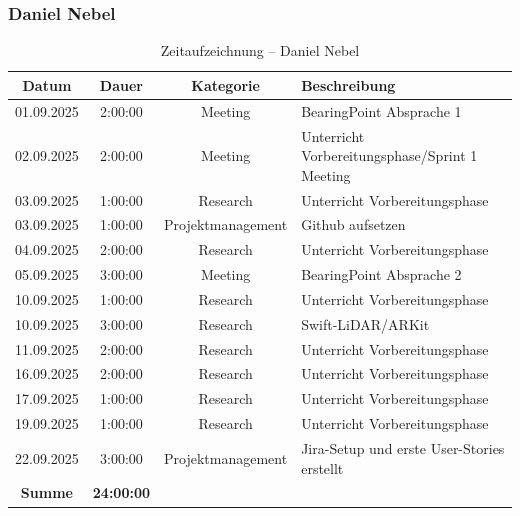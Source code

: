 \documentclass{article}
\begin{document}
\subsubsection*{Daniel Nebel}
\begin{table}[H]
  \centering
  \begin{tabularx}{\textwidth}{|c|c|c|X|}
    \hline
    \rowcolor{black!10}\textbf{Datum} & \textbf{Dauer} & \textbf{Kategorie} & \textbf{Beschreibung} \\
    \hline
    01.09.2025 & 2:00:00 & Meeting           & BearingPoint Absprache 1 \\ \hline
    02.09.2025 & 2:00:00 & Meeting           & Unterricht Vorbereitungsphase/Sprint 1 Meeting \\ \hline
    03.09.2025 & 1:00:00 & Research          & Unterricht Vorbereitungsphase \\ \hline
    03.09.2025 & 1:00:00 & Projektmanagement & Github aufsetzen \\ \hline
    04.09.2025 & 2:00:00 & Research          & Unterricht Vorbereitungsphase \\ \hline
    05.09.2025 & 3:00:00 & Meeting           & BearingPoint Absprache 2 \\ \hline
    10.09.2025 & 1:00:00 & Research          & Unterricht Vorbereitungsphase \\ \hline
    10.09.2025 & 3:00:00 & Research          & Swift-LiDAR/ARKit \\ \hline
    11.09.2025 & 2:00:00 & Research          & Unterricht Vorbereitungsphase \\ \hline
    16.09.2025 & 2:00:00 & Research          & Unterricht Vorbereitungsphase \\ \hline
    17.09.2025 & 1:00:00 & Research          & Unterricht Vorbereitungsphase \\ \hline
    19.09.2025 & 1:00:00 & Research          & Unterricht Vorbereitungsphase \\ \hline
    22.09.2025 & 3:00:00 & Projektmanagement & Jira-Setup und erste User-Stories erstellt \\ \hline
    \rowcolor{black!10}\textbf{Summe} & \textbf{24:00:00} & & \\ \hline
  \end{tabularx}
  \caption{Zeitaufzeichnung – Daniel Nebel}
  \label{tab:zeit-daniel}
\end{table}
\end{document}
